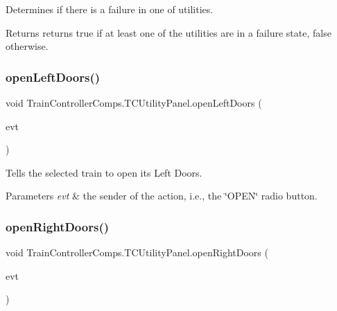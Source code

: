 Determines if there is a failure in one of utilities. 

\begin{DoxyReturn}{Returns}
returns true if at least one of the utilities are in a failure state, false otherwise. 
\end{DoxyReturn}
\mbox{\label{classTrainControllerComps_1_1TCUtilityPanel_ab9991ca4e0a03b9e7a1b8e4fc130a4c7}} 
\subsubsection{\texorpdfstring{open\+Left\+Doors()}{openLeftDoors()}}
{\footnotesize\ttfamily void Train\+Controller\+Comps.\+T\+C\+Utility\+Panel.\+open\+Left\+Doors (\begin{DoxyParamCaption}\item[{java.\+awt.\+event.\+Action\+Event}]{evt }\end{DoxyParamCaption})\hspace{0.3cm}{\ttfamily [private]}}



Tells the selected train to open its Left Doors. 


\begin{DoxyParams}{Parameters}
{\em evt} & the sender of the action, i.\+e., the \char`\"{}\+O\+P\+E\+N\char`\"{} radio button. \\
\hline
\end{DoxyParams}
\mbox{\label{classTrainControllerComps_1_1TCUtilityPanel_a2c749a54d70852921749ad2821a0de91}} 
\subsubsection{\texorpdfstring{open\+Right\+Doors()}{openRightDoors()}}
{\footnotesize\ttfamily void Train\+Controller\+Comps.\+T\+C\+Utility\+Panel.\+open\+Right\+Doors (\begin{DoxyParamCaption}\item[{java.\+awt.\+event.\+Action\+Event}]{evt }\end{DoxyParamCaption})\hspace{0.3cm}{\ttfamily [private]}}



